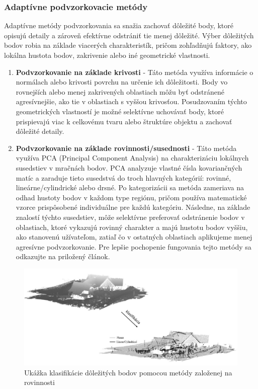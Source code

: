 \subsubsection{Adaptívne podvzorkovacie metódy}
\noindent Adaptívne metódy podvzorkovania sa snažia zachovať dôležité body, ktoré opisujú detaily a zároveň efektívne odstrániť tie menej dôležité. Výber dôležitých bodov robia na základe viacerých charakteristík, pričom zohľadňujú faktory, ako lokálna hustota bodov, zakrivenie alebo iné geometrické vlastnosti.
\begin{enumerate}
  \item\textbf{Podvzorkovanie na základe krivosti} - Táto metóda využíva informácie o normálach alebo krivosti povrchu na určenie ich dôležitosti. Body vo rovnejších alebo menej zakrivených oblastiach môžu byť odstránené agresívnejšie, ako tie v oblastiach s vyššou krivosťou. Posudzovaním týchto geometrických vlastností je možné selektívne uchovávať body, ktoré prispievajú viac k celkovému tvaru alebo štruktúre objektu a zachovať dôležité detaily.
  \item\textbf{Podvzorkovanie na základe rovinnosti/susednosti} - Táto metóda využíva PCA (Principal Component Analysis) na charakterizáciu lokálnych susedstiev v mračnách bodov. PCA analyzuje vlastné čísla kovariančných matíc a zaraduje tieto susedstvá do troch hlavných kategórií: rovinné, lineárne/cylindrické alebo drsné. Po kategorizácii sa metóda zameriava na odhad hustoty bodov v každom type regiónu, pričom používa matematické vzorce prispôsobené individuálne pre každú kategóriu. Následne, na základe znalostí týchto susedstiev, môže selektívne preferovať odstránenie bodov v oblastiach, ktoré vykazujú rovinný charakter a majú hustotu bodov vyššiu, ako stanovenú užívateľom, zatiaľ čo v ostatných oblastiach aplikujeme menej agresívne podvzorkovanie. Pre lepšie pochopenie fungovania tejto metódy sa odkazujte na priložený článok. \cite{adaptive_downsampling_neighborhood}
\end{enumerate}
\begin{figure}[!htbp]
  \centering
  \includegraphics[width=15cm]{img/planar_example.png}
  \caption{Ukážka klasifikácie dôležitých bodov pomocou metódy založenej na rovinnosti \cite{adaptive_downsampling_neighborhood}}
  \label{noname}
\end{figure}

